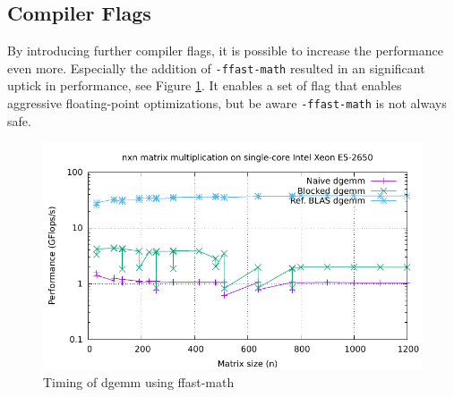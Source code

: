 \subsection{Compiler Flags}
By introducing further compiler flags, it is possible to increase the performance even more. Especially the addition of \texttt{-ffast-math} \cite{noauthor_floatingpointmath_nodate} resulted in an significant uptick in performance, see Figure \ref{fig:dgemm-fm}. It enables a set of flag that enables aggressive floating-point optimizations, but be aware \texttt{-ffast-math} is not always safe.
\begin{figure}[H]
	\centering
	\includegraphics[width=\textwidth]{../media/timing-36-fast-math.pdf}
	\caption{Timing of dgemm using ffast-math}
	\label{fig:dgemm-fm}
\end{figure}



